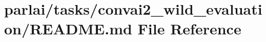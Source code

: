 \hypertarget{parlai_2tasks_2convai2__wild__evaluation_2README_8md}{}\section{parlai/tasks/convai2\+\_\+wild\+\_\+evaluation/\+R\+E\+A\+D\+ME.md File Reference}
\label{parlai_2tasks_2convai2__wild__evaluation_2README_8md}
